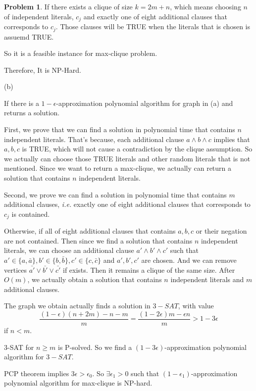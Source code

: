 \documentclass[a4paper]{article}
\theoremstyle{definition}
\newtheorem{problem}{Problem}
\theoremstyle{plain}
\numberwithin{equation}{problem}
\newcommand{\ie}{ \textit{ i.e. } }
\begin{document}
\begin{problem}
  If  there exists a clique of size  $ k=2m+n $, which means choosing  $ n $ of  independent literals,  $ c_j $ and exactly one of eight additional clauses that corresponds to  $ c_j $. Those clauses will be TRUE when the literals that is chosen is assuemd TRUE.
  
  So it is a feasible instance for max-clique problem.

  Therefore, It is NP-Hard.

  (b) 
  
  If there is a  $ 1-\epsilon $-approximation polynomial algorithm for graph in (a) and returns a solution. 

  First, we prove that we can find a solution in polynomial time that contains $ n $ independent literals. That's because, each additional clause  $ a\wedge b\wedge c $  implies that  $ a,b,c  $ is TRUE, which will not cause a contradiction by the clique assumption. So we actually can choose those TRUE literals and other random literals that is not mentioned. Since we want to return a max-clique, we actually can return a solution that contains  $ n  $ independent literals. 
  
  Second, we prove we can find a solution in polynomial time that contains  $ m  $ additional clauses, \ie exactly one of eight additional clauses that corresponds to  $ c_j $ is contained.

  Otherwise, if all of eight additional clauses that contains  $ a,b,c $ or their negation  are not contained. Then since we find a solution that contains  $ n $ independent literals, we can choose an additional clause  $ a'\wedge b'\wedge c' $ such that  $ a'\in\{a,\bar{a}\},b'\in\{b,\bar{b}\},c'\in \{c,\bar{c}\} $ and  $ a',b',c' $  are chosen. And we can remove vertices  $ \bar{a'}\vee \bar{b'}\vee \bar{c'} $  if exists. Then it remains a clique of the same size. After  $ O(m) $, we actually obtain a solution that contains  $ n $ independent literals and  $ m $ additional clauses.  
  
  The graph we obtain actually finds a solution in  $ 3-SAT $, with value 
  \[\frac{(1-\epsilon)(n+2m)-n-m}{m}=\frac{(1-2\epsilon)m-\epsilon n}{m}>1-3\epsilon\]
  if  $ n<m $.
  
  3-SAT for $ n \geq m $ is P-solved. So we find a  $ (1-3\epsilon) $-approximation polynomial algorithm for  $ 3-SAT $.
  
  PCP theorem implies  $ 3\epsilon>\epsilon_0 $. So  $ \exists \epsilon_1>0 $  such that  $ (1-\epsilon_1) $-approximation polynomial algorithm for  max-clique is NP-hard.
  

\end{problem}
\end{document}
